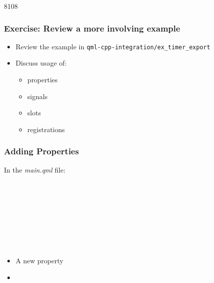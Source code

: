 \begin{slide}{8108}\frametitle{Exercise: Review a more involving example}

  \begin{itemize}
  \item Review the example in \texttt{qml-cpp-integration/ex\_timer\_export}
  \item Discuss usage of:
    \begin{itemize}
    \item properties
    \item signals
    \item slots
    \item registrations
    \end{itemize}
  \end{itemize}
\end{slide}

\begin{slide}[fragile]\frametitle{Adding Properties}

In the \textit{main.qml} file:

\vspace*{0.5em}
\begin{qml}
\\
\\
\vspace*{0.5em}
\\
\\
\\
\qtt{~~~~\}}\\
\qtt{\}}\\
\end{qml}

\begin{itemize}
\item A new  property

\item[] 
\end{itemize}

\end{slide}



